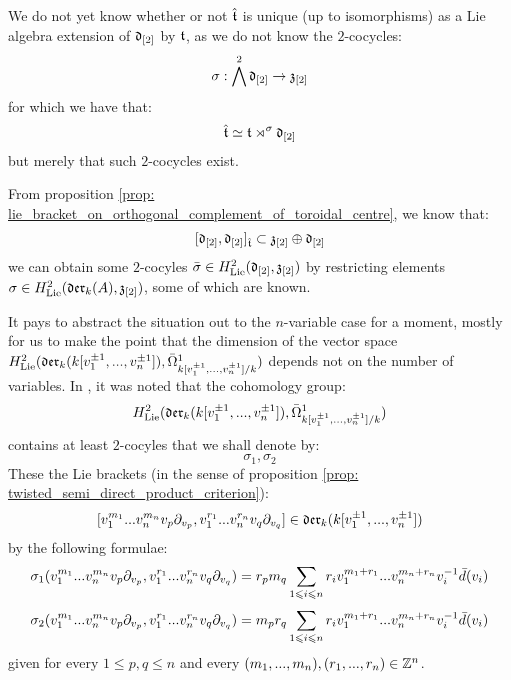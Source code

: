         \begin{remark}
            We do not yet know whether or not $\hat{\mathfrak{t}}$ is unique (up to isomorphisms) as a Lie algebra extension of $\mathfrak{d}_{[2]}$ by $\mathfrak{t}$, as we do not know the $2$-cocycles:
                $$\sigma: \bigwedge^2 \mathfrak{d}_{[2]} \to \mathfrak{z}_{[2]}$$
            for which we have that:
                $$\hat{\mathfrak{t}} \simeq \mathfrak{t} \rtimes^{\sigma} \mathfrak{d}_{[2]}$$
            but merely that such $2$-cocycles exist. 
        \end{remark}
        \begin{remark} \label{remark: non_uniqueness_of_yangian_extended_lie_algebras}
            From proposition \ref{prop: lie_bracket_on_orthogonal_complement_of_toroidal_centre}, we know that:
                $$[\mathfrak{d}_{[2]}, \mathfrak{d}_{[2]}]_{\hat{\mathfrak{t}}} \subset \mathfrak{z}_{[2]} \oplus \mathfrak{d}_{[2]}$$
            we can obtain some $2$-cocyles $\bar{\sigma} \in H^2_{\mathrm{Lie}}(\mathfrak{d}_{[2]}, \mathfrak{z}_{[2]})$ by restricting elements $\sigma \in H^2_{\mathrm{Lie}}(\mathfrak{der}_k(A), \mathfrak{z}_{[2]})$, some of which are known.

            It pays to abstract the situation out to the $n$-variable case for a moment, mostly for us to make the point that the dimension of the vector space $H^2_{\mathrm{Lie}}(\mathfrak{der}_k(k[v_1^{\pm 1}, ..., v_n^{\pm 1}]), \bar{\Omega}^1_{k[v_1^{\pm 1}, ..., v_n^{\pm 1}]/k})$ depends not on the number of variables. In \cite[p. 5, below Equation 1.3]{billig_energy_momentum_tensor}, it was noted that the cohomology group:
                $$H^2_{\mathrm{Lie}}(\mathfrak{der}_k(k[v_1^{\pm 1}, ..., v_n^{\pm 1}]), \bar{\Omega}^1_{k[v_1^{\pm 1}, ..., v_n^{\pm 1}]/k})$$
            contains at least $2$-cocyles that we shall denote by:
                $$\sigma_1, \sigma_2$$
            These  the Lie brackets (in the sense of proposition \ref{prop: twisted_semi_direct_product_criterion}):
                $$[v_1^{m_1} ... v_n^{m_n} v_p \partial_{v_p}, v_1^{r_1} ... v_n^{r_n} v_q \partial_{v_q}] \in \mathfrak{der}_k(k[v_1^{\pm 1}, ..., v_n^{\pm 1}])$$
            by the following formulae:
                $$\sigma_1(v_1^{m_1} ... v_n^{m_n} v_p \partial_{v_p}, v_1^{r_1} ... v_n^{r_n} v_q \partial_{v_q}) = r_p m_q \sum_{1 \leqslant i \leqslant n} r_i v_1^{m_1 + r_1} ... v_n^{m_n + r_n} v_i^{-1} \bar{d}(v_i)$$
                $$\sigma_2(v_1^{m_1} ... v_n^{m_n} v_p \partial_{v_p}, v_1^{r_1} ... v_n^{r_n} v_q \partial_{v_q}) = m_p r_q \sum_{1 \leqslant i \leqslant n} r_i v_1^{m_1 + r_1} ... v_n^{m_n + r_n} v_i^{-1} \bar{d}(v_i)$$
            given for every $1 \leq p, q \leq n$ and every $(m_1, ..., m_n), (r_1, ..., r_n) \in \mathbb{Z}^n$. 


\end{remark}
